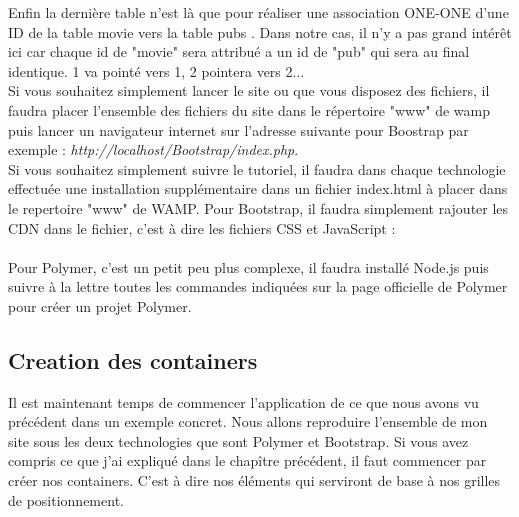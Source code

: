 \documentclass{article}
\begin{document}
Enfin la derni\`ere table n'est l\`a que pour r\'ealiser une association ONE-ONE d'une ID de la table \og movie \fg{} vers la table \og pubs \fg{}. Dans notre cas, il n'y a pas grand int\'er\^et ici car chaque id de "movie" sera attribu\'e a un id de "pub" qui sera au final identique. 1 va point\'e vers 1, 2 pointera vers 2...
\vspace{0.5cm}\\
Si vous souhaitez simplement lancer le site ou que vous disposez des fichiers, il faudra placer l'ensemble des fichiers du site dans le r\'epertoire "www" de wamp puis lancer un navigateur internet sur l'adresse suivante pour Boostrap par exemple : \textit{http://localhost/Bootstrap/index.php}.\\
Si vous souhaitez simplement suivre le tutoriel, il faudra dans chaque technologie effectu\'ee une installation suppl\'ementaire dans un fichier index.html \`a placer dans le repertoire "www" de WAMP. Pour Bootstrap, il faudra simplement rajouter les CDN dans le fichier, c'est \`a dire les fichiers CSS et JavaScript :
\vspace{0.5cm}\\
\vspace{0.5cm}\\
Pour Polymer, c'est un petit peu plus complexe, il faudra install\'e Node.js puis suivre \`a la lettre toutes les commandes indiqu\'ees sur la page officielle de Polymer pour cr\'eer un projet Polymer.

\subsection{Creation des containers}

Il est maintenant temps de commencer l'application de ce que nous avons vu pr\'ec\'edent dans un exemple concret. Nous allons reproduire l'ensemble de mon site sous les deux technologies que sont Polymer et Bootstrap. Si vous avez compris ce que j'ai expliqu\'e dans le chap\^itre pr\'ec\'edent, il faut commencer par cr\'eer nos containers. C'est \`a dire nos \'el\'ements qui serviront de base \`a nos grilles de positionnement.
\end{document}
